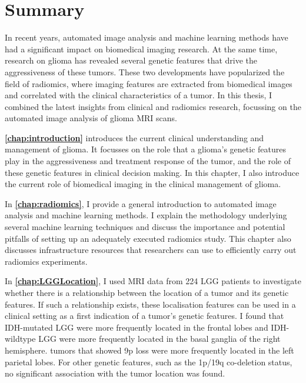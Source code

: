 \chapter{Summary}
\begin{ChapterAbstractNoTitle}
\end{ChapterAbstractNoTitle}

In recent years, automated image analysis and machine learning methods have had a significant impact on biomedical imaging research.
At the same time, research on glioma has revealed several genetic features that drive the aggressiveness of these \glspl{tumor}.
These two developments have popularized the field of radiomics, where imaging features are extracted from biomedical images and correlated with the clinical characteristics of a \gls{tumor}.
In this thesis, I combined the latest insights from clinical and radiomics research, focussing on the automated image analysis of glioma \gls{MRI} scans.

\textbf{\cref{chap:introduction}} introduces the current clinical understanding and management of glioma.
It focusses on the role that a glioma's genetic features play in the aggressiveness and treatment response of the \gls{tumor}, and the role of these genetic features in clinical decision making.
In this chapter, I also introduce the current role of biomedical imaging in the clinical management of glioma.

In \textbf{\cref{chap:radiomics}}, I provide a general introduction to automated image analysis and machine learning methods.
I explain the methodology underlying several machine learning techniques and discuss the importance and potential pitfalls of setting up an adequately executed radiomics study.
This chapter also discusses infrastructure resources that researchers can use to efficiently carry out radiomics experiments.

In \textbf{\cref{chap:LGGLocation}}, I used MRI data from 224 \gls{LGG} patients to investigate whether there is a relationship between the location of a \gls{tumor} and its genetic features.
If such a relationship exists, these localisation features can be used in a clinical setting as a first indication of a \gls{tumor}'s genetic features.
I found that \gls{IDH}-mutated \gls{LGG} were more frequently located in the frontal lobes and \gls{IDH}-wildtype \gls{LGG} were more frequently located in the basal ganglia of the right hemisphere.
\Glspl{tumor} that showed 9p loss were more frequently located in the left parietal lobes.
For other genetic features, such as the 1p/19q co-deletion status, no significant association with the \gls{tumor} location was found.

